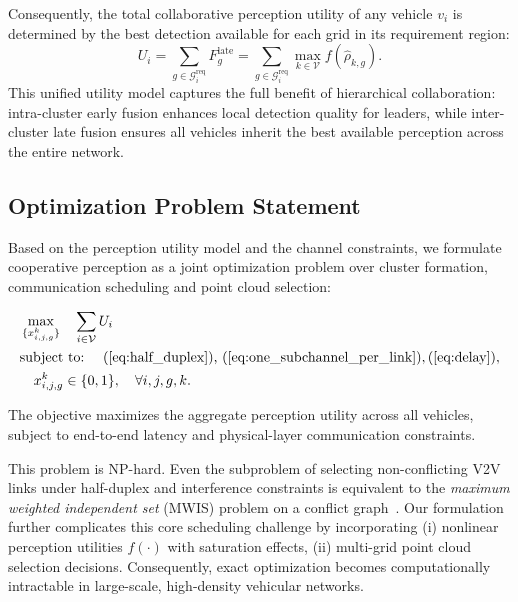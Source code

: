 \documentclass[conference]{IEEEtran}
\begin{document}
Consequently, the total collaborative perception utility of any vehicle $v_i$ is determined by the best detection available for each grid in its requirement region:
\begin{equation}
U_i = \sum_{g \in \mathcal{G}_i^{\mathrm{req}}} F_g^{\mathrm{late}} = \sum_{g \in \mathcal{G}_i^{\mathrm{req}}} \max_{k \in \mathcal{V}} f(\hat{\rho}_{k,g}).
\label{eq:U_total}
\end{equation}
This unified utility model captures the full benefit of hierarchical collaboration: intra-cluster early fusion enhances local detection quality for leaders, while inter-cluster late fusion ensures all vehicles inherit the best available perception across the entire network.


\subsection{Optimization Problem Statement}
\label{sec:problem_formulation}



Based on the perception utility model and the channel constraints, we formulate cooperative perception as a joint optimization problem over cluster formation, communication scheduling and point cloud selection:

\begin{align}
& \max_{\{x_{i,j,g}^{k}\}} \quad \sum_{i \in \mathcal{V}} U_i
\label{eq:target} \\
& \text{subject to:} \quad
\text{
(\ref{eq:half_duplex}), 
(\ref{eq:one_subchannel_per_link})},
(\ref{eq:delay}), 
\notag \\
& \quad x_{i,j,g}^{k} \in \{0,1\}, \quad \forall i,j,g,k. \notag
\end{align}

The objective maximizes the aggregate perception utility across all vehicles, subject to 
end-to-end latency
and physical-layer communication constraints.

This problem is NP-hard. Even the subproblem of selecting non-conflicting V2V links under half-duplex and interference constraints is equivalent to the \emph{maximum weighted independent set} (MWIS) problem on a conflict graph~\cite{basagni2001mwis}. Our formulation further complicates this core scheduling challenge by incorporating (i) nonlinear perception utilities $f(\cdot)$ with saturation effects, (ii) multi-grid point cloud selection decisions. Consequently, exact optimization becomes computationally intractable in large-scale, high-density vehicular networks.
\end{document}
